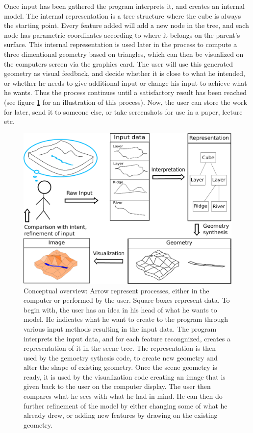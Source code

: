 \documentclass[a4paper,12pt]{report}
\begin{document}
Once input has been gathered the program interprets it, and creates an internal model. The internal representation is a tree structure where the cube is always the starting point. Every feature added will add a new node in the tree, and each node has parametric coordinates according to where it belongs on the parent's surface. This internal representation is used later in the process to compute a three dimentional geometry based on triangles, which can then be visualized on the computers screen via the graphics card. The user will use this generated geometry as visual feedback, and decide whether it is close to what he intended, or whether he needs to give additional input or change his input to achieve what he wants. Thus the process continues until a satisfactory result has been reached (see figure \ref{fig:overviewConcept} for an illustration of this process). Now, the user can store the work for later, send it to someone else, or take screenshots for use in a paper, lecture etc.


\begin{figure}
 \includegraphics[width=\linewidth]{thesis/overviewConcept.pdf}
 \caption{Conceptual overview: Arrow represent processes, either in the computer or performed by the user. Square boxes represent data. To begin with, the user has an idea in his head of what he wants to model. He indicates what he want to create to the program through various input methods resulting in the input data. The program interprets the input data, and for each feature recongnized, creates a representation of it in the scene tree. The representation is then used by the gemoetry sythesis code, to create new geometry and alter the shape of existing geometry. Once the scene geometry is ready, it is used by the visualization code creating an image that is given back to the user on the computer display. The user then compares what he sees with what he had in mind. He can then do further refinement of the model by either changing some of what he already drew, or adding new features by drawing on the existing geometry.}
 \label{fig:overviewConcept}
\end{figure}
\end{document}
